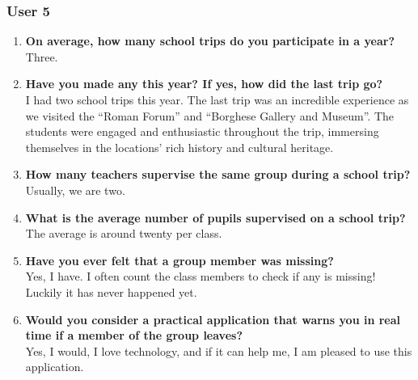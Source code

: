 \subsubsection*{User 5}
\begin{enumerate}
\item \textbf{On average, how many school trips do you participate in a year?}
\\ Three.
\item \textbf{Have you made any this year? If yes, how did the last trip go?}
\\ I had two school trips this year. The last trip was an incredible experience as we visited the ``Roman Forum'' and ``Borghese Gallery and Museum''. The students were engaged and enthusiastic throughout the trip, immersing themselves in the locations' rich history and cultural heritage. 
\item \textbf{How many teachers supervise the same group during a school trip?}
\\ Usually, we are two.
\item \textbf{What is the average number of pupils supervised on a school trip?}
\\ The average is around twenty per class.
\item \textbf{Have you ever felt that a group member was missing?}
\\ Yes, I have. I often count the class members to check if any is missing! Luckily it has never happened yet. 
\item \textbf{Would you consider a practical application that warns you in real time if a member of the group leaves?}
\\ Yes, I would, I love technology, and if it can help me, I am pleased to use this application.
\end{enumerate}

